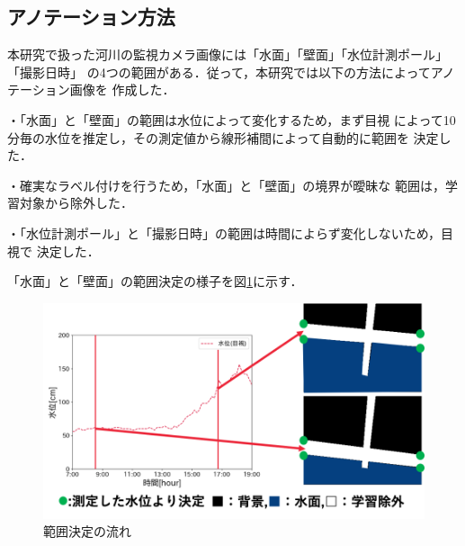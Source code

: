 \subsection{アノテーション方法}
\label{4.2}
本研究で扱った河川の監視カメラ画像には「水面」「壁面」「水位計測ポール」「撮影日時」
の4つの範囲がある．従って，本研究では以下の方法によってアノテーション画像を
作成した．
\begin{description}
  \item・「水面」と「壁面」の範囲は水位によって変化するため，まず目視
  によって10分毎の水位を推定し，その測定値から線形補間によって自動的に範囲を
  決定した．
  \vspace{-3mm}
  \item・確実なラベル付けを行うため，「水面」と「壁面」の境界が曖昧な
  範囲は，学習対象から除外した．
  \vspace{-3mm}
  \item・「水位計測ポール」と「撮影日時」の範囲は時間によらず変化しないため，目視で
  決定した．
  \vspace{-3mm}
\end{description}
「水面」と「壁面」の範囲決定の様子を図\ref{ano2}に示す．
\vspace{20mm}
\begin{figure}[ht]
  \centering
  \includegraphics[keepaspectratio,width=\linewidth]{image/ano2.png}
  \caption{範囲決定の流れ}
  \label{ano2}
\end{figure}
\clearpage

